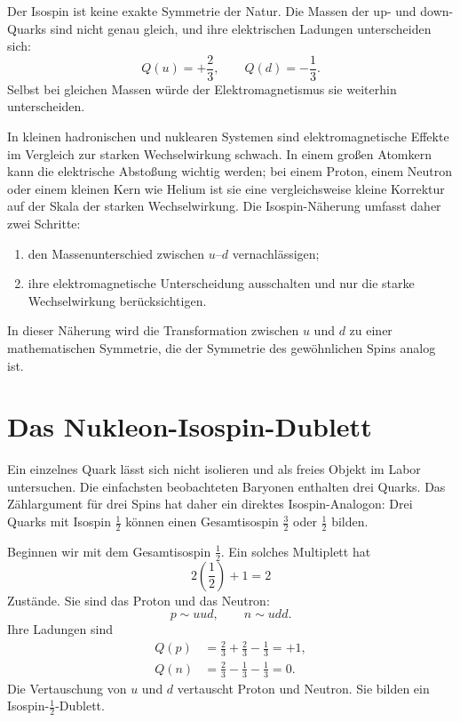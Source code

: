 Der Isospin ist keine exakte Symmetrie der Natur. Die Massen der up- und down-Quarks sind nicht genau gleich, und ihre elektrischen Ladungen unterscheiden sich:
\begin{equation}
Q(u)=+\frac23,
\qquad
Q(d)=-\frac13.
\end{equation}
Selbst bei gleichen Massen würde der Elektromagnetismus sie weiterhin unterscheiden.

In kleinen hadronischen und nuklearen Systemen sind elektromagnetische Effekte im Vergleich zur starken Wechselwirkung schwach. In einem großen Atomkern kann die elektrische Abstoßung wichtig werden; bei einem Proton, einem Neutron oder einem kleinen Kern wie Helium ist sie eine vergleichsweise kleine Korrektur auf der Skala der starken Wechselwirkung. Die Isospin-Näherung umfasst daher zwei Schritte:

\begin{enumerate}
\item den Massenunterschied zwischen \(u\)--\(d\) vernachlässigen;
\item ihre elektromagnetische Unterscheidung ausschalten und nur die starke Wechselwirkung berücksichtigen.
\end{enumerate}

In dieser Näherung wird die Transformation zwischen \(u\) und \(d\) zu einer mathematischen Symmetrie, die der Symmetrie des gewöhnlichen Spins analog ist.

\section{Das Nukleon-Isospin-Dublett}

Ein einzelnes Quark lässt sich nicht isolieren und als freies Objekt im Labor untersuchen. Die einfachsten beobachteten Baryonen enthalten drei Quarks. Das Zählargument für drei Spins hat daher ein direktes Isospin-Analogon: Drei Quarks mit Isospin \(\tfrac12\) können einen Gesamtisospin \(\tfrac32\) oder \(\tfrac12\) bilden.

Beginnen wir mit dem Gesamtisospin \(\tfrac12\). Ein solches Multiplett hat
\begin{equation}
2\left(\frac12\right)+1=2
\end{equation}
Zustände. Sie sind das Proton und das Neutron:
\begin{equation}
p\sim uud,
\qquad
n\sim udd.
\end{equation}
Ihre Ladungen sind
\begin{align}
Q(p)
&=\frac23+\frac23-\frac13
=+1,\\
Q(n)
&=\frac23-\frac13-\frac13
=0.
\end{align}
Die Vertauschung von \(u\) und \(d\) vertauscht Proton und Neutron. Sie bilden ein Isospin-\(\tfrac12\)-Dublett.

